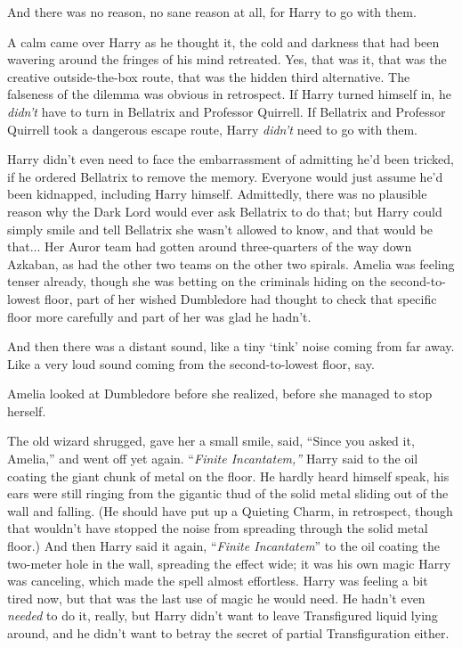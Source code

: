 And there was no reason, no sane reason at all, for Harry to go with them.

A calm came over Harry as he thought it, the cold and darkness that had been wavering around the fringes of his mind retreated. Yes, that was it, that was the creative outside-the-box route, that was the hidden third alternative. The falseness of the dilemma was obvious in retrospect. If Harry turned himself in, he \emph{didn’t} have to turn in Bellatrix and Professor Quirrell. If Bellatrix and Professor Quirrell took a dangerous escape route, Harry \emph{didn’t} need to go with them.

Harry didn’t even need to face the embarrassment of admitting he’d been tricked, if he ordered Bellatrix to remove the memory. Everyone would just assume he’d been kidnapped, including Harry himself. Admittedly, there was no plausible reason why the Dark Lord would ever ask Bellatrix to do that; but Harry could simply smile and tell Bellatrix she wasn’t allowed to know, and that would be that...
\sbreak
Her Auror team had gotten around three-quarters of the way down Azkaban, as had the other two teams on the other two spirals. Amelia was feeling tenser already, though she was betting on the criminals hiding on the second-to-lowest floor, part of her wished Dumbledore had thought to check that specific floor more carefully and part of her was glad he hadn’t.

And then there was a distant sound, like a tiny ‘tink’ noise coming from far away. Like a very loud sound coming from the second-to-lowest floor, say.

Amelia looked at Dumbledore before she realized, before she managed to stop herself.

The old wizard shrugged, gave her a small smile, said, “Since you asked it, Amelia,” and went off yet again.
\sbreak
“\emph{Finite Incantatem,”} Harry said to the oil coating the giant chunk of metal on the floor. He hardly heard himself speak, his ears were still ringing from the gigantic thud of the solid metal sliding out of the wall and falling. (He should have put up a Quieting Charm, in retrospect, though that wouldn’t have stopped the noise from spreading through the solid metal floor.) And then Harry said it again, “\emph{Finite Incantatem}” to the oil coating the two-meter hole in the wall, spreading the effect wide; it was his own magic Harry was canceling, which made the spell almost effortless. Harry was feeling a bit tired now, but that was the last use of magic he would need. He hadn’t even \emph{needed} to do it, really, but Harry didn’t want to leave Transfigured liquid lying around, and he didn’t want to betray the secret of partial Transfiguration either.

